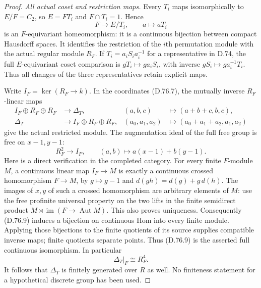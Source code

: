 \begin{proof}
\emph{All actual coset and restriction maps.}
Every $T_i$ maps isomorphically to $E/F=C_2$, so
$E=FT_i$ and $F\cap T_i=1$. Hence
\[
        F\longrightarrow E/T_i,\qquad a\longmapsto aT_i
                                                               \tag{D.76.7}
\]
is an $F$-equivariant homeomorphism: it is a continuous
bijection between compact Hausdorff spaces.
It identifies the restriction of the $i$th permutation
module with the actual regular module $R_F$.
If $T_i=a_iS_i a_i^{-1}$ for a representative in D.74,
the full $E$-equivariant coset comparison is
$gT_i\mapsto ga_iS_i$, with inverse
$gS_i\mapsto ga_i^{-1}T_i$.
Thus all changes of the three representatives retain
explicit maps.

Write $I_F=\ker(R_F\to k)$.
In the coordinates (D.76.7), the mutually inverse
$R_F$-linear maps
\[
 \begin{aligned}
 I_F\oplus R_F\oplus R_F&\longrightarrow\Delta_T,
                &(a,b,c)&\longmapsto(a+b+c,b,c),\\
 \Delta_T&\longrightarrow I_F\oplus R_F\oplus R_F,
                &(a_0,a_1,a_2)&\longmapsto
                             (a_0+a_1+a_2,a_1,a_2)
 \end{aligned}                                                \tag{D.76.8}
\]
give the actual restricted module.
The augmentation ideal of the full free group is
free on $x-1,y-1$:
\[
       R_F^2\longrightarrow I_F,\qquad
                  (a,b)\longmapsto a(x-1)+b(y-1).
                                                               \tag{D.76.9}
\]
Here is a direct verification in the completed category.
For every finite $F$-module $M$, a continuous linear
map $I_F\to M$ is exactly a continuous crossed
homomorphism $F\to M$, by $g\mapsto g-1$ and
$d(gh)=d(g)+g\,d(h)$.
The images of $x,y$ of such a crossed homomorphism
are arbitrary elements of $M$: use the free profinite
universal property on the two lifts in the finite
semidirect product $M\rtimes\operatorname{im}(F\to\operatorname{Aut}M)$.
This also proves uniqueness.
Consequently (D.76.9) induces a bijection on continuous
Hom into every finite module. Applying those bijections
to the finite quotients of its source supplies compatible
inverse maps; finite quotients separate points.
Thus (D.76.9) is the asserted full continuous isomorphism.
In particular
\[
                         \Delta_T|_F\cong R_F^4.             \tag{D.76.10}
\]
It follows that $\Delta_T$ is finitely generated over
$R$ as well. No finiteness statement for a hypothetical
discrete group has been used.


\end{proof}
